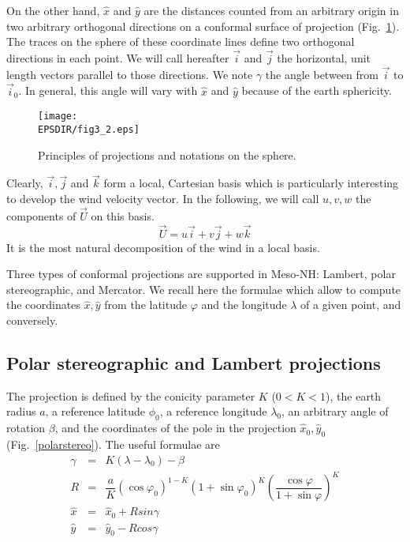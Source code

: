 On the other hand, $\widehat{x}$ and $\widehat{y}$
are the distances counted from an arbitrary origin in two arbitrary orthogonal
directions on a conformal surface of projection (Fig.~\ref{projection}).
The traces
on the sphere of these coordinate lines define two orthogonal directions
in each point.  We will call hereafter $\vec{i}$ and $\vec{j}$ the horizontal,
unit length vectors parallel to those directions.
We note $\gamma$ the angle between from $\vec{i}$ to
$\vec{i}_0$. In general, this angle will vary with $\widehat{x}$ and
$\widehat{y}$ because of the earth sphericity.

\begin{figure}[!ht]
\centerline{\texttt{[image: \\EPSDIR/fig3\_2.eps]}}
\caption{Principles of projections and notations on the sphere.}
\label{projection}
\end{figure}

Clearly, $\vec{i},\vec{j}$ and $\vec{k}$ form a local, Cartesian basis
which is particularly interesting to develop the wind
velocity vector. In the following, we will call $ u ,  v , w$ the
components of ${\vec U}$ on this basis.
\begin{equation}
\vec{U}=u\vec{i}+v\vec{j}+w\vec{k}
\end{equation}
It is the most natural decomposition of the wind in a local basis.

Three types of conformal projections are supported in Meso-NH: Lambert, polar
stereographic, and Mercator. We recall here the formulae which allow to
compute the coordinates $\widehat{x},\widehat{y}$ from the latitude $\varphi$
and the longitude $\lambda$ of a given point, and conversely.

\subsection{Polar stereographic and Lambert projections}

The projection is defined by the conicity parameter $K$ ($0<K<1$), the
earth radius $a$,
a reference latitude $\phi_0$, a reference
longitude $\lambda_0$, an arbitrary angle of rotation $\beta$,
and the coordinates of the pole in the projection
$\widehat{x}_0, \widehat{y}_0$ (Fig.~\ref{polarstereo}).
The useful formulae are
\begin{eqnarray}
\gamma & = & K (\lambda - \lambda _{0}) - \beta \nonumber \\
R &  = & \dfrac{a}{K} (\cos\varphi _{0})^{1-K} (1 + \sin\varphi _{0})^{K}
\left(\dfrac{\cos\varphi }{1 + \sin\varphi}\right)^{K} \nonumber \\
\widehat{x}& = & \widehat{x}_0 + R sin\gamma \\
\widehat{y}& = & \widehat{y}_0 - R cos \gamma \nonumber
\end{eqnarray}

